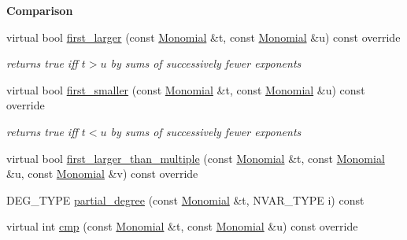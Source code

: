 \begin{Indent}\textbf{ Comparison}\par
\begin{DoxyCompactItemize}
\item 
\mbox{\label{group__orderinggroup_a7ed2a24b293d63e26c0cdbe4270682a8}} 
virtual bool \hyperlink{group__orderinggroup_a7ed2a24b293d63e26c0cdbe4270682a8}{first\+\_\+larger} (const \hyperlink{group__polygroup_class_monomial}{Monomial} \&t, const \hyperlink{group__polygroup_class_monomial}{Monomial} \&u) const override
\begin{DoxyCompactList}\small\item\em returns {\ttfamily true} iff $t>u$ by sums of successively fewer exponents \end{DoxyCompactList}\item 
\mbox{\label{group__orderinggroup_abb1afdfa6ace5b90e425d0645e278c67}} 
virtual bool \hyperlink{group__orderinggroup_abb1afdfa6ace5b90e425d0645e278c67}{first\+\_\+smaller} (const \hyperlink{group__polygroup_class_monomial}{Monomial} \&t, const \hyperlink{group__polygroup_class_monomial}{Monomial} \&u) const override
\begin{DoxyCompactList}\small\item\em returns {\ttfamily true} iff $t< u$ by sums of successively fewer exponents \end{DoxyCompactList}\item 
virtual bool \hyperlink{group__orderinggroup_a4f8a9207711dabeb940fba0e32f4ab1f}{first\+\_\+larger\+\_\+than\+\_\+multiple} (const \hyperlink{group__polygroup_class_monomial}{Monomial} \&t, const \hyperlink{group__polygroup_class_monomial}{Monomial} \&u, const \hyperlink{group__polygroup_class_monomial}{Monomial} \&v) const override
\item 
D\+E\+G\+\_\+\+T\+Y\+PE \hyperlink{group__orderinggroup_a24d2e7bf28ecab1d8a6c703147f48341}{partial\+\_\+degree} (const \hyperlink{group__polygroup_class_monomial}{Monomial} \&t, N\+V\+A\+R\+\_\+\+T\+Y\+PE i) const
\item 
virtual int \hyperlink{group__orderinggroup_a1b668700d9ccc218ebae6049bb76fb07}{cmp} (const \hyperlink{group__polygroup_class_monomial}{Monomial} \&t, const \hyperlink{group__polygroup_class_monomial}{Monomial} \&u) const override
\end{DoxyCompactItemize}
\end{Indent}

